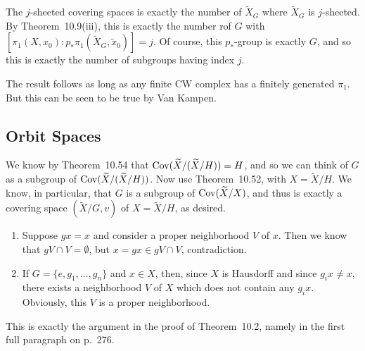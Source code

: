 \documentclass[../../solutions.tex]{subfiles}
\begin{document}
\begin{exercise} \leavevmode
The $j$-sheeted covering spaces is exactly the number of $\widetilde X_G$ where $\widetilde X_G$ is $j$-sheeted.
By Theorem~10.9(iii), this is exactly the number rof $G$ with $[\pi_1(X,x_0):p_*\pi_1(\widetilde X_G,\tilde x_0)]=j$.
Of course, this $p_*$-group is exactly $G$, and so this is exactly the number of subgroups having index $j$.
\end{exercise}

\begin{exercise} \leavevmode
The result follows as long as any finite CW complex has a finitely generated $\pi_1$.
But this can be seen to be true by Van Kampen.
\end{exercise}

\subsection{Orbit Spaces}
\begin{exercise} \leavevmode
We know by Theorem~10.54 that $\operatorname{Cov}(\widetilde X/(\widetilde X/H))=H$, and so we can think of $G$ as a subgroup of $\operatorname{Cov}(\widetilde X/(\widetilde X/H))$.
Now use Theorem~10.52, with $X=\widetilde X/H$.
We know, in particular, that $G$ is a subgroup of $\operatorname{Cov}(\widetilde X/X)$, and thus is exactly a covering space $(\widetilde X/G,v)$ of $X=\widetilde X/H$, as desired.
\end{exercise}

\begin{exercise} \leavevmode
\begin{enumerate}
\item
Suppose $gx=x$ and consider a proper neighborhood $V$ of $x$.
Then we know that $gV\cap V=\emptyset$, but $x=gx\in gV\cap V$, contradiction.

\item
If $G=\{e,g_1,\dots,g_n\}$ and $x\in X$, then, since $X$ is Hausdorff and since $g_ix\ne x$, there exists a neighborhood $V$ of $X$ which does not contain any $g_ix$.
Obviously, this $V$ is a proper neighborhood.
\end{enumerate}
\end{exercise}

\begin{exercise} \leavevmode
This is exactly the argument in the proof of Theorem~10.2, namely in the first full paragraph on p.~276.
\end{exercise}
\end{document}
